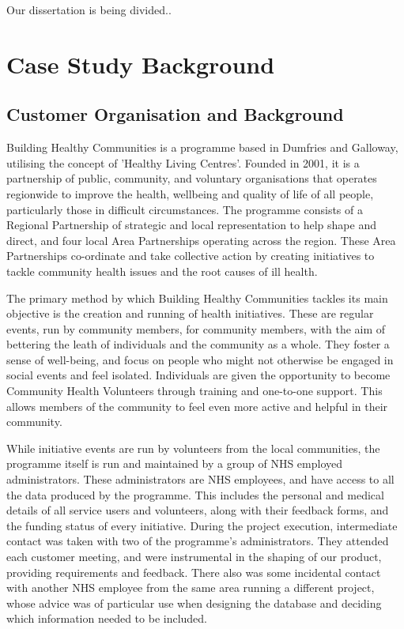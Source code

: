 \documentclass{l3proj}
\begin{document}
Our dissertation is being divided..

\section{Case Study Background}

\subsection{Customer Organisation and Background}
\label{customer}

Building Healthy Communities is a programme based in Dumfries and Galloway, utilising the concept of 'Healthy Living Centres'. Founded in 2001, it is a partnership of public, community, and voluntary organisations that operates regionwide to improve the health, wellbeing and quality of life of all people, particularly those in difficult circumstances. The programme consists of a Regional Partnership of strategic and local representation to help shape and direct, and four local Area Partnerships operating across the region. These Area Partnerships co-ordinate and take collective action by creating initiatives to tackle community health issues and the root causes of ill health.

The primary method by which Building Healthy Communities tackles its main objective is the creation and running of health initiatives. These are regular events, run by community members, for community members, with the aim of bettering the leath of individuals and the community as a whole. They foster a sense of well-being, and focus on people who might not otherwise be engaged in social events and feel isolated. Individuals are given the opportunity to become Community Health Volunteers through training and one-to-one support. This allows members of the community to feel even more active and helpful in their community.

While initiative events are run by volunteers from the local communities, the programme itself is run and maintained by a group of NHS employed administrators. These administrators are NHS employees, and have access to all the data produced by the programme. This includes the personal and medical details of all service users and volunteers, along with their feedback forms, and the funding status of every initiative. During the project execution, intermediate contact was taken with two of the programme's administrators. They attended each customer meeting, and were instrumental in the shaping of our product, providing requirements and feedback. There also was some incidental contact with another NHS employee from the same area running a different project, whose advice was of particular use when designing the database and deciding which information needed to be included.
\end{document}
